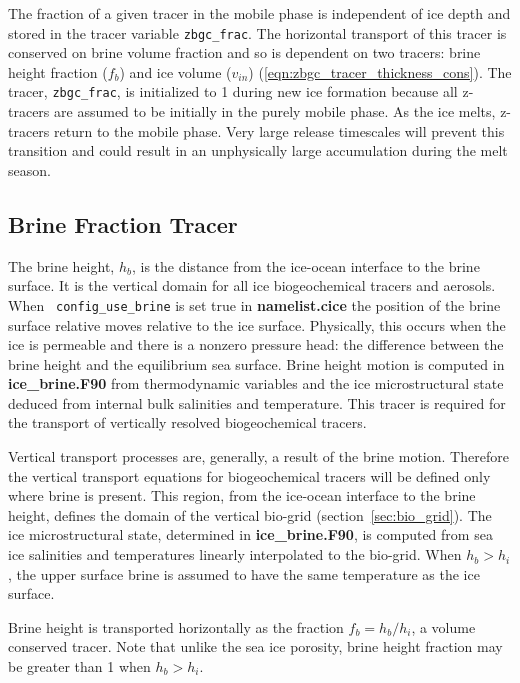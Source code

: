 The fraction of a given tracer in the mobile phase is independent of
ice depth and stored in the
tracer variable  {\tt zbgc\_frac}. The horizontal transport of this
tracer is conserved on brine volume fraction and so is dependent on two
tracers: brine height fraction ($f_b$) and ice volume ($v_{in}$) (\ref{eqn:zbgc_tracer_thickness_cons}).  The tracer, {\tt zbgc\_frac}, is initialized to 1 during new ice formation because
 all z-tracers are assumed to be initially in the purely mobile phase.
As the ice melts, z-tracers return to the mobile phase.
Very large release timescales will prevent this transition and could
result in an unphysically large accumulation during the melt season.

\subsection{Brine Fraction Tracer} 
\label{sec:brine} 
The brine height, $h_b$, is the distance from the
ice-ocean interface to the brine surface. It is the vertical domain
for all ice biogeochemical tracers and aerosols.   When {\tt
  config\_use\_brine} is set true in {\bf namelist.cice} the position
of the  brine
surface  relative moves relative to the
 ice surface. Physically, this occurs when the ice is permeable and there is
a nonzero pressure head: the difference between the brine
height and the equilibrium sea surface. Brine height motion is
computed in {\bf ice\_brine.F90} from thermodynamic variables and the ice microstructural state
deduced from internal bulk salinities and temperature.  This tracer
is required for the transport of vertically resolved biogeochemical
tracers. 
 
Vertical transport
processes are, generally, a result of the brine motion. Therefore the vertical
transport equations for biogeochemical tracers will be defined only
where brine is present.  This region, from the ice-ocean interface to
the brine height, defines the domain of the vertical bio-grid (section~\ref{sec:bio_grid}). The ice
microstructural state, determined in {\bf ice\_brine.F90}, is computed
from sea ice salinities and temperatures linearly interpolated to the
bio-grid.  When $h_b > h_i$, the upper surface brine is assumed to
have the same temperature as the ice surface. 

Brine height is  transported horizontally as the
fraction $f_{b} = h_b/h_i$, a volume conserved
tracer.  Note
that unlike the sea ice porosity, brine height fraction may be greater than 1
when $h_b > h_i$. 

